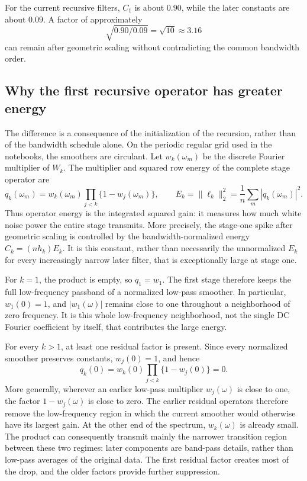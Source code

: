 \documentclass[11pt]{article}
\begin{document}
For the current recursive filters, $C_1$ is about $0.90$, while the later
constants are about $0.09$. A factor of approximately
\[
\sqrt{0.90/0.09}=\sqrt{10}\approx3.16
\]
can remain after geometric scaling without contradicting the common bandwidth
order.

\subsection{Why the first recursive operator has greater energy}

The difference is a consequence of the initialization of the recursion, rather
than of the bandwidth schedule alone. On the periodic regular grid used in the
notebooks, the smoothers are circulant. Let $w_k(\omega_m)$ be the discrete
Fourier multiplier of $W_k$. The multiplier and squared row energy of the
complete stage operator are
\[
q_k(\omega_m)
=w_k(\omega_m)\prod_{j<k}\{1-w_j(\omega_m)\},
\qquad
E_k=\lVert\ell_k\rVert_2^2
=\frac{1}{n}\sum_m |q_k(\omega_m)|^2.
\]
Thus operator energy is the integrated squared gain: it measures how much white
noise power the entire stage transmits. More precisely, the stage-one spike
after geometric scaling is controlled by the bandwidth-normalized energy
$C_k=(nh_k)E_k$. It is this constant, rather than necessarily the unnormalized
$E_k$ for every increasingly narrow later filter, that is exceptionally large
at stage one.

For $k=1$, the product is empty, so $q_1=w_1$. The first stage therefore keeps
the full low-frequency passband of a normalized low-pass smoother. In
particular, $w_1(0)=1$, and $|w_1(\omega)|$ remains close to one throughout a
neighborhood of zero frequency. It is this whole low-frequency neighborhood,
not the single DC Fourier coefficient by itself, that contributes the large
energy.

For every $k>1$, at least one residual factor is present. Since every
normalized smoother preserves constants, $w_j(0)=1$, and hence
\[
q_k(0)=w_k(0)\prod_{j<k}\{1-w_j(0)\}=0.
\]
More generally, wherever an earlier low-pass multiplier $w_j(\omega)$ is close
to one, the factor $1-w_j(\omega)$ is close to zero. The earlier residual
operators therefore remove the low-frequency region in which the current
smoother would otherwise have its largest gain. At the other end of the
spectrum, $w_k(\omega)$ is already small. The product can consequently transmit
mainly the narrower transition region between these two regimes: later
components are band-pass details, rather than low-pass averages of the original
data. The first residual factor creates most of the drop, and the older factors
provide further suppression.
\end{document}
